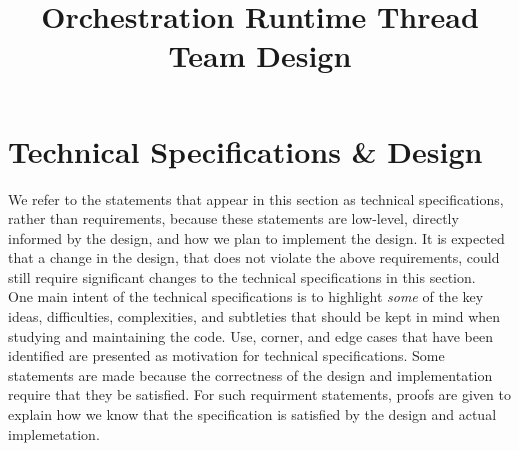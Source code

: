 \documentclass{article}
\title{Orchestration Runtime Thread Team Design}
\begin{document}
\theoremstyle{definition} %
\newtheorem{req}{Req}[section]
\newtheorem{spec}{Spec}[section]

\maketitle

\section{Technical Specifications \& Design}
We refer to the statements that appear in this section as technical
specifications, rather than requirements, because these statements are low-level,
directly informed by the design, and how we plan to implement the design.
It is expected that a change in the design, that does not violate the
above requirements, could still require significant changes to the technical
specifications in this section.\\

One main intent of the technical specifications is to highlight \textit{some} of
the key ideas, difficulties, complexities, and subtleties that should be kept in
mind when studying and maintaining the code.  Use, corner, and edge cases
that have been identified are presented as motivation for technical
specifications.  Some statements are made because the correctness of
the design and implementation require that they be satisfied.  For such
requirment statements, proofs are given to explain how we know that the
specification is satisfied by the design and actual implemetation.\\
\end{document}
